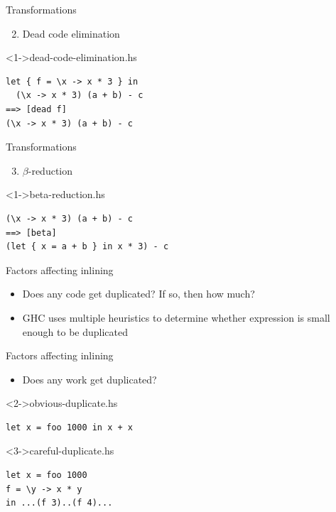 \documentclass[hyperref={pdfpagelabels=false},xcolor={dvipsnames},compress,table,usenames,dvipsnames]{beamer}
\begin{document}
    \begin{frame}[fragile]{Transformations}
        \begin{enumerate}
        \setcounter{enumi}{1}
        \item Dead code elimination
        \end{enumerate}
        \begin{exampleblock}
            <1->{dead-code-elimination.hs}
            \begin{lstlisting}
let { f = \x -> x * 3 } in
  (\x -> x * 3) (a + b) - c
==> [dead f]
(\x -> x * 3) (a + b) - c
            \end{lstlisting}
        \end{exampleblock}
    \end{frame}
    
    \begin{frame}[fragile]{Transformations}
        \begin{enumerate}
        \setcounter{enumi}{2}
        \item $\beta$-reduction
        \end{enumerate}
        \begin{exampleblock}
            <1->{beta-reduction.hs}
            \begin{lstlisting}
(\x -> x * 3) (a + b) - c
==> [beta]
(let { x = a + b } in x * 3) - c
            \end{lstlisting}
        \end{exampleblock}
    \end{frame}

    \begin{frame}{Factors affecting inlining}
        \begin{itemize}
            \item Does any code get duplicated? If so, then how much? \pause
            \item GHC uses multiple heuristics to determine whether expression is small enough to be duplicated
        \end{itemize}
    \end{frame}

    \begin{frame}[fragile]{Factors affecting inlining}
        \begin{itemize}
            \item Does any work get duplicated?
        \end{itemize}
        \begin{exampleblock}
            <2->{obvious-duplicate.hs}
            \begin{lstlisting}
let x = foo 1000 in x + x
            \end{lstlisting}
        \end{exampleblock}
        \begin{exampleblock}
            <3->{careful-duplicate.hs}
            \begin{lstlisting}
let x = foo 1000
f = \y -> x * y
in ...(f 3)..(f 4)...
            \end{lstlisting}
        \end{exampleblock}
    \end{frame}
\end{document}
